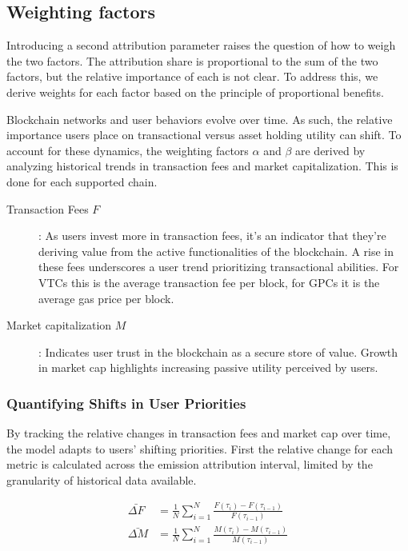 \documentclass[11pt]{report}
\begin{document}
\subsection{Weighting factors}

Introducing a second attribution parameter raises the question of how to weigh the two factors. The attribution share is proportional to the sum of the two factors, but the relative importance of each is not clear. To address this, we derive weights for each factor based on the principle of proportional benefits.

Blockchain networks and user behaviors evolve over time. As such, the relative importance users place on transactional versus asset holding utility can shift. To account for these dynamics, the weighting factors $\alpha$ and $\beta$ are derived by analyzing historical trends in transaction fees and market capitalization. This is done for each supported chain.

\begin{description}
    \item[Transaction Fees $F$]: As users invest more in transaction fees, it's an indicator that they're deriving value from the active functionalities of the blockchain. A rise in these fees underscores a user trend prioritizing transactional abilities. For \ac{VTC}s this is the average transaction fee per block, for \ac{GPC}s it is the average gas price per block.
    \item[Market capitalization $M$]: Indicates user trust in the blockchain as a secure store of value. Growth in market cap highlights increasing passive utility perceived by users.
\end{description}

\subsubsection{Quantifying Shifts in User Priorities}

By tracking the relative changes in transaction fees and market cap over time, the model adapts to users' shifting priorities. First the relative change for each metric is calculated across the emission attribution interval, limited by the granularity of historical data available.

\begin{align}
    \bar{\Delta F} & = \frac{1}{N}\sum_{i=1}^{N}\frac{F(\tau_i) - F(\tau_{i-1})}{F(\tau_{i-1})} \\
    \bar{\Delta M} & = \frac{1}{N}\sum_{i=1}^{N}\frac{M(\tau_i) - M(\tau_{i-1})}{M(\tau_{i-1})}
\end{align}
\end{document}
